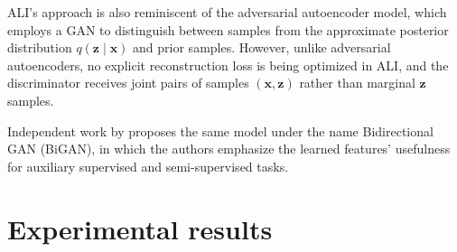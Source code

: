 \documentclass{article}
\begin{document}
ALI's approach is also reminiscent of the adversarial autoencoder model, which
employs a GAN to distinguish between samples from the approximate posterior
distribution $q(\bm{z} \mid \bm{x})$ and prior samples. However, unlike
adversarial autoencoders, no explicit reconstruction loss is being optimized in
ALI, and the discriminator receives joint pairs of samples $(\bm{x}, \bm{z})$
rather than marginal $\bm{z}$ samples.

Independent work by \citet{donahue2016adversarial} proposes the same model under
the name Bidirectional GAN (BiGAN), in which the authors emphasize the learned
features' usefulness for auxiliary supervised and semi-supervised tasks.

\section{Experimental results}
\end{document}
